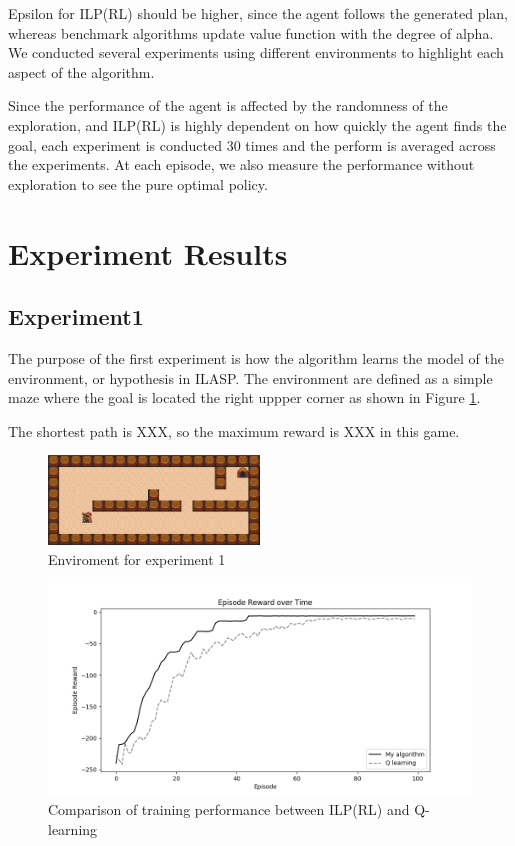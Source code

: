 Epsilon for ILP(RL) should be higher, since the agent follows the generated plan, 
whereas benchmark algorithms update value function with the degree of alpha. 
We conducted several experiments using different environments to highlight each aspect of the algorithm.

Since the performance of the agent is affected by the randomness of the exploration, 
and ILP(RL) is highly dependent on how quickly the agent finds the goal, 
each experiment is conducted 30 times and the perform is averaged across the experiments.
At each episode, we also measure the performance without exploration to see the pure optimal policy.

\section{Experiment Results}
\label{learning_evaluation}

\subsection{Experiment1}
The purpose of the first experiment is how the algorithm learns the model of the environment, or hypothesis in ILASP.
The environment are defined as a simple maze where the goal is located the right uppper corner as shown in Figure \ref{experiment1}.

The shortest path is XXX, so the maximum reward is XXX in this game. 

\begin{figure}[!htb]
\centering
\includegraphics[width=0.5\textwidth]{./figures/experiment1}
\caption{Enviroment for experiment 1}
\label{experiment1}
\end{figure}

\begin{figure}[!htb]
\centering
\includegraphics[width=1.0\textwidth]{./figures/experiment1_training}
\caption{Comparison of training performance between ILP(RL) and Q-learning}
\label{experiment1_training}
\end{figure}

